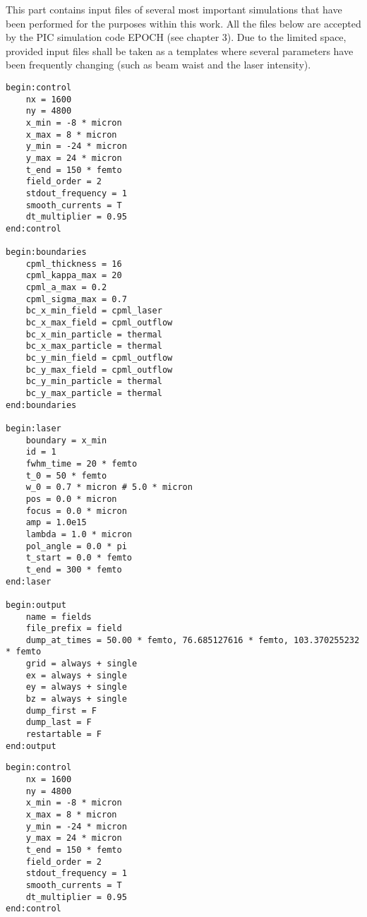 This part contains input files of several most important simulations that have been performed for the purposes within this work. All the files below are accepted by the PIC simulation code EPOCH (see chapter 3). Due to the limited space, provided input files shall be taken as a templates where several parameters have been frequently changing (such as beam waist and the laser intensity).

\setlength{\columnsep}{30pt}
\begin{multicols}{2}
\begin{lstlisting}[style=CXX, caption={Input file for evaluation of the implemented algorithm for tight-focusing (chapter 4). In this case, the laser beam propagates according to the Maxwell consistent approach.}]
begin:control
	nx = 1600
	ny = 4800
	x_min = -8 * micron
	x_max = 8 * micron
	y_min = -24 * micron
	y_max = 24 * micron
	t_end = 150 * femto
	field_order = 2
	stdout_frequency = 1
	smooth_currents = T
	dt_multiplier = 0.95
end:control

begin:boundaries
	cpml_thickness = 16
	cpml_kappa_max = 20
	cpml_a_max = 0.2
	cpml_sigma_max = 0.7
	bc_x_min_field = cpml_laser
	bc_x_max_field = cpml_outflow
	bc_x_min_particle = thermal
	bc_x_max_particle = thermal
	bc_y_min_field = cpml_outflow
	bc_y_max_field = cpml_outflow
	bc_y_min_particle = thermal
	bc_y_max_particle = thermal
end:boundaries

begin:laser
	boundary = x_min
	id = 1
	fwhm_time = 20 * femto
	t_0 = 50 * femto
	w_0 = 0.7 * micron # 5.0 * micron
	pos = 0.0 * micron
	focus = 0.0 * micron
	amp = 1.0e15
	lambda = 1.0 * micron
	pol_angle = 0.0 * pi
	t_start = 0.0 * femto
	t_end = 300 * femto
end:laser

begin:output
	name = fields
	file_prefix = field
	dump_at_times = 50.00 * femto, 76.685127616 * femto, 103.370255232 * femto
	grid = always + single
	ex = always + single
	ey = always + single
	bz = always + single
	dump_first = F
	dump_last = F
	restartable = F
end:output
\end{lstlisting}

\begin{lstlisting}[style=CXX, caption={Input file for identifying the conditions for which the propagation of the laser beam under the paraxial approximation is valid (chapter 4).}]
begin:control
	nx = 1600
	ny = 4800
	x_min = -8 * micron
	x_max = 8 * micron
	y_min = -24 * micron
	y_max = 24 * micron
	t_end = 150 * femto
	field_order = 2
	stdout_frequency = 1
	smooth_currents = T
	dt_multiplier = 0.95
end:control


\end{lstlisting}
\end{multicols}
